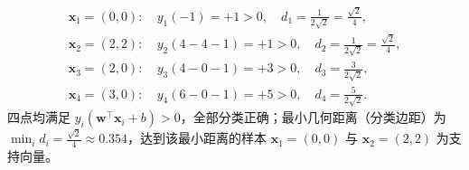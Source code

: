 \begin{exercise}[title={感知机迭代更新与 SVM 几何边距手算},level=standard,points=15,tags={感知机,SVM,分类边距,支持向量}]
\begin{solution}
\begin{enumerate}
  \[\begin{aligned}
    \bm{x}_1=(0,0):&\ y_1(-1) = +1 > 0,\quad d_1 = \frac{1}{2\sqrt{2}} = \frac{\sqrt{2}}{4},\\
    \bm{x}_2=(2,2):&\ y_2(4-4-1) = +1 > 0,\quad d_2 = \frac{1}{2\sqrt{2}} = \frac{\sqrt{2}}{4},\\
    \bm{x}_3=(2,0):&\ y_3(4-0-1) = +3 > 0,\quad d_3 = \frac{3}{2\sqrt{2}},\\
    \bm{x}_4=(3,0):&\ y_4(6-0-1) = +5 > 0,\quad d_4 = \frac{5}{2\sqrt{2}}.
  \end{aligned}\]
  四点均满足 $y_i(\bm{w}^\top\bm{x}_i+b)>0$，全部分类正确；最小几何距离（分类边距）为 $\min_i d_i = \frac{\sqrt{2}}{4} \approx 0.354$，达到该最小距离的样本 $\bm{x}_1=(0,0)$ 与 $\bm{x}_2=(2,2)$ 为支持向量。
\end{enumerate}
\end{solution}
\end{exercise}

